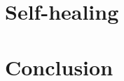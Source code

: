 \documentclass{report}
\begin{document}
\chapter{Self-healing}


\chapter{Conclusion}




\clearpage
{}


\end{document}
